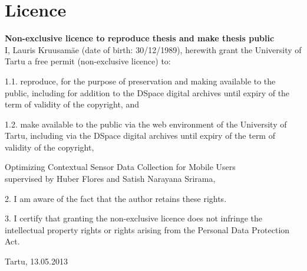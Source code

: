 \documentclass[oneside,12pt]{Latex/Classes/PhDthesisPSnPDF}
\begin{document}
\backmatter

\newpage

\chapter{Licence}

\textbf{Non-exclusive licence to reproduce thesis and make thesis public}\\

I, Lauris Kruusamäe (date of birth: 30/12/1989), herewith grant the University of Tartu a free permit (non-exclusive licence) to: 

1.1. reproduce, for the purpose of preservation and making available to the public, including for addition to the DSpace digital archives until expiry of the term of validity of the copyright, and

1.2. make available to the public via the web environment of the University of Tartu, including via the DSpace digital archives until expiry of the term of validity of the copyright,

\begin{center}
Optimizing Contextual Sensor Data Collection for Mobile Users\\
supervised by Huber Flores and Satish Narayana Srirama,
\end{center}

2. I am aware of the fact that the author retains these rights.

3. I certify that granting the non-exclusive licence does not infringe the intellectual property rights or rights arising from the Personal Data Protection Act. 

\centering
\vspace{3cm}
Tartu, 13.05.2013

\newpage




\end{document}
